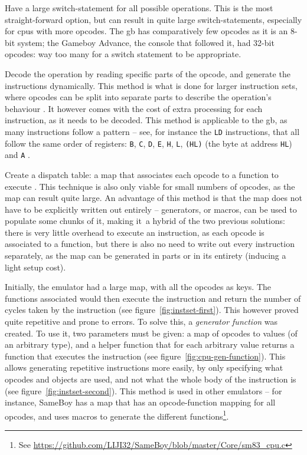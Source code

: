 \documentclass[11pt]{informatics-report}
\newcommand{\ftnt}[1]{\footnote{See \url{#1}}}
\begin{document}
\begin{compactitem}
    \item Have a large switch-statement for all possible operations. This is the most straight-forward option, but can result in quite large switch-statements, especially for \glspl{cpu} with more opcodes. The \gls{gb} has comparatively few opcodes as it is an 8-bit system; the Gameboy Advance, the console that followed it, had 32-bit opcodes: way too many for a switch statement to be appropriate.
    \item Decode the operation by reading specific parts of the opcode, and generate the instructions dynamically. This method is what is done for larger instruction sets, where opcodes can be split into separate parts to describe the operation's behaviour \cite[ARM CPU Reference]{gbatek}. It however comes with the cost of extra processing for each instruction, as it needs to be decoded. This method is applicable to the \gls{gb}, as many instructions follow a pattern -- see, for instance the \texttt{LD} instructions, that all follow the same order of registers: \texttt{B}, \texttt{C}, \texttt{D}, \texttt{E}, \texttt{H}, \texttt{L}, \texttt{(HL)} (the byte at address \texttt{HL}) and \texttt{A} \cite{gbcpuinstr}.
    \item Create a dispatch table: a map that associates each opcode to a function to execute \cite{dispatch_table}. This technique is also only viable for small numbers of opcodes, as the map can result quite large. An advantage of this method is that the map does not have to be explicitly written out entirely -- generators, or macros, can be used to populate some chunks of it, making it a hybrid of the two previous solutions: there is very little overhead to execute an instruction, as each opcode is associated to a function, but there is also no need to write out every instruction separately, as the map can be generated in parts or in its entirety (inducing a light setup cost).
\end{compactitem}

Initially, the emulator had a large map, with all the opcodes as keys. The functions associated would then execute the instruction and return the number of cycles taken by the instruction (see figure~\ref{fig:instset-first}). This however proved quite repetitive and prone to errors. To solve this, a \textit{generator function} was created. To use it, two parameters must be given: a map of opcodes to values (of an arbitrary type), and a helper function that for each arbitrary value returns a function that executes the instruction (see figure~\ref{fig:cpu-gen-function}). This allows generating repetitive instructions more easily, by only specifying what opcodes and objects are used, and not what the whole body of the instruction is (see figure~\ref{fig:instset-second}). This method is used in other emulators -- for instance, SameBoy has a map that has an opcode-function mapping for all opcodes, and uses macros to generate the different functions\ftnt{https://github.com/LIJI32/SameBoy/blob/master/Core/sm83\_cpu.c}.
\end{document}
